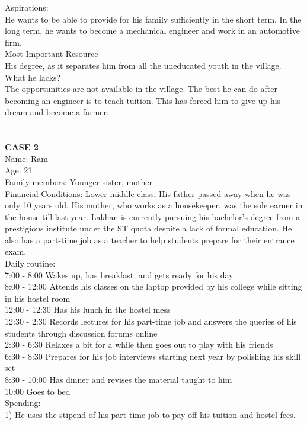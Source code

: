 \documentclass{article}
\begin{document}
Aspirations:\\
He wants to be able to provide for his family sufficiently in the short term. In the long term, he wants to become a mechanical engineer and work in an automotive firm.\\
Most Important Resource\\
His degree, as it separates him from all the uneducated youth in the village. \\
What he lacks?\\
The opportunities are not available in the village. The best he can do after becoming an engineer is to teach tuition. This has forced him to give up his dream and become a farmer.\\\\\\
\textbf{CASE 2}\\
Name: Ram\\
Age: 21\\
Family members: Younger sister, mother\\
Financial Conditions: 
Lower middle class; His father passed away when he was only 10 years old.
His mother, who works as a housekeeper, was the sole earner in the house till last year. Lakhan is currently pursuing his bachelor's degree from a prestigious institute under the ST quota despite a lack of formal education. He also has a part-time job as a teacher to help students prepare for their entrance exam.\\
Daily routine:\\
7:00 - 8:00 Wakes up, has breakfast, and gets ready for his day\\
8:00 - 12:00 Attends his classes on the laptop provided by his college while sitting in his hostel room\\
12:00 - 12:30 Has his lunch in the hostel mess\\
12:30 - 2:30 Records lectures for his part-time job and answers the queries of his students through discussion forums online\\
2:30 - 6:30 Relaxes a bit for a while then goes out to play with his friends\\
6:30 - 8:30 Prepares for his job interviews starting next year by polishing his skill set\\
8:30 - 10:00 Has dinner and revises the material taught to him \\
10:00 Goes to bed\\
Spending:\\
1) He uses the stipend of his part-time job to pay off his tuition and hostel fees.\\
\end{document}
